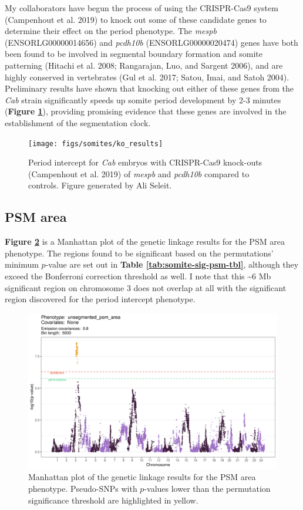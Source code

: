 \documentclass[
]{book}
\begin{document}
My collaborators have begun the process of using the CRISPR-Cas9 system (Campenhout et al. 2019) to knock out some of these candidate genes to determine their effect on the period phenotype. The \emph{mespb} (ENSORLG00000014656) and \emph{pcdh10b} (ENSORLG00000020474) genes have both been found to be involved in segmental boundary formation and somite patterning (Hitachi et al. 2008; Rangarajan, Luo, and Sargent 2006), and are highly conserved in vertebrates (Gul et al. 2017; Satou, Imai, and Satoh 2004). Preliminary results have shown that knocking out either of these genes from the \emph{Cab} strain significantly speeds up somite period development by 2-3 minutes (\textbf{Figure \ref{fig:ko-period}}), providing promising evidence that these genes are involved in the establishment of the segmentation clock.



\begin{figure}
\texttt{[image: figs/somites/ko\_results]} \caption{Period intercept for \emph{Cab} embryos with CRISPR-Cas9 knock-outs (Campenhout et al. 2019) of \emph{mespb} and \emph{pcdh10b} compared to controls. Figure generated by Ali Seleit.}\label{fig:ko-period}
\end{figure}

\hypertarget{psm-area}{%
\subsection{PSM area}\label{psm-area}}

\textbf{Figure \ref{fig:psm-manhattan}} is a Manhattan plot of the genetic linkage results for the PSM area phenotype. The regions found to be significant based on the permutations' minimum \(p\)-value are set out in \textbf{Table \ref{tab:somite-sig-psm-tbl}}, although they exceed the Bonferroni correction threshold as well. I note that this \textasciitilde6 Mb significant region on chromosome 3 does not overlap at all with the significant region discovered for the period intercept phenotype.



\begin{figure}
\includegraphics[width=1\linewidth]{figs/somites/manhattan_psm_no-covariates} \caption{Manhattan plot of the genetic linkage results for the PSM area phenotype. Pseudo-SNPs with \(p\)-values lower than the permutation significance threshold are highlighted in yellow.}\label{fig:psm-manhattan}
\end{figure}
\end{document}
